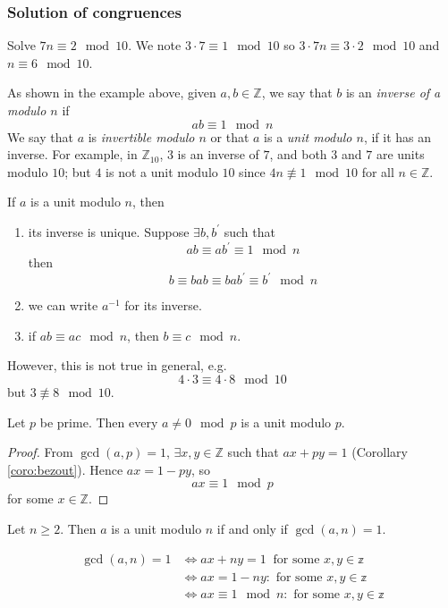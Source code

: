 \documentclass[10pt, a4paper, twoside]{report}
\begin{document}
\subsubsection{Solution of congruences}
\begin{example}
    Solve \(7n\equiv 2\mod 10\).\newline 
    We note \(3\cdot 7\equiv 1\mod 10\) so \(3\cdot 7n\equiv 3\cdot 2\mod 10\) and \(n\equiv 6\mod 10\).
\end{example}
As shown in the example above, given \(a,b\in\mathbb{Z}\), we say that \(b\) is an \emph{inverse of a modulo \(n\)} if \[ab\equiv 1\mod n\]
We say that \(a\) is \emph{invertible modulo \(n\)} or that \(a\) is a \emph{unit modulo \(n\)}, if it has an inverse. For example, in \(\mathbb{Z}_{10}\), \(3\) is an inverse of \(7\), and both \(3\) and \(7\) are units modulo \(10\); but \(4\) is not a unit modulo \(10\) since \(4n\nequiv 1\mod 10\) for all \(n\in\mathbb{Z}\).
\begin{remark}
    If \(a\) is a unit modulo \(n\), then 
    \begin{enumerate}
        \item its inverse is unique. Suppose \(\exists b,b^\prime\) such that 
        \[ab\equiv ab^\prime\equiv 1\mod n\]
        then
        \[b\equiv bab\equiv bab^\prime\equiv b^\prime\mod n\]
        \item we can write \(a^{-1}\) for its inverse.
        \item if \(ab\equiv ac\mod n\), then \(b\equiv c\mod n\).
    \end{enumerate}
    However, this is not true in general, e.g. 
    \[4\cdot 3\equiv 4\cdot 8\mod 10\]
    but \(3\nequiv 8\mod 10\).
\end{remark}
\begin{proposition}
    Let \(p\) be prime. Then every \(a\neq 0\mod p\) is a unit modulo \(p\).
\end{proposition}
\begin{proof}
    From \(\gcd(a,p)=1\), \(\exists x,y\in\mathbb{Z}\) such that \(ax+py=1\) (Corollary \ref{coro:bezout}). Hence \(ax=1-py\), so 
    \[ax\equiv 1\mod p\]
    for some \(x\in\mathbb{Z}\).
\end{proof}
\begin{proposition}
    Let \(n\geq 2\). Then \(a\) is a unit modulo \(n\) if and only if \(\gcd(a,n)=1\).
\end{proposition}
\proof
\begin{align*}
    \gcd(a,n)=1&\Leftrightarrow ax+ny=1\:\text{ for some \(x,y\in\mathbb{z}\)} \\
    &\Leftrightarrow ax=1-ny:\text{ for some \(x,y\in\mathbb{z}\)} \\
    &\Leftrightarrow ax\equiv 1\mod n:\text{ for some \(x,y\in\mathbb{z}\)}
\end{align*}
\end{document}
